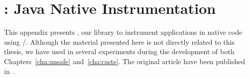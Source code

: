 \chapter{\jnif{}: Java Native Instrumentation}\label{ap:jnif}

This appendix presents \jnif{}, our library to instrument \java{} applications in native code using \cc{}/\cpp{}.
Although the material presented here is not directly related to this thesis, we have used \jnif{} in several experiments during the development of both Chapters~\ref{cha:unsafe} and~\ref{cha:casts}.
The original article have been published in~\cite{mastrangeloJNIFJavaNative2014}.









